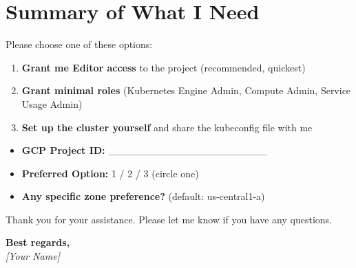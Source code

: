 \documentclass[11pt,a4paper]{article}
\begin{document}
\section{Summary of What I Need}

Please choose one of these options:

\begin{enumerate}[label=\textbf{\arabic*.}]
    \item \textbf{Grant me Editor access} to the project (recommended, quickest)
    \item \textbf{Grant minimal roles} (Kubernetes Engine Admin, Compute Admin, Service Usage Admin)
    \item \textbf{Set up the cluster yourself} and share the kubeconfig file with me
\end{enumerate}

\vspace{1em}

\begin{tcolorbox}[colback=blue!5,colframe=blue!50!black,title=\textbf{Information I Need From You}]
\begin{itemize}
    \item \textbf{GCP Project ID:} \_\_\_\_\_\_\_\_\_\_\_\_\_\_\_\_\_\_\_\_\_\_
    \item \textbf{Preferred Option:} 1 / 2 / 3 (circle one)
    \item \textbf{Any specific zone preference?} (default: us-central1-a)
\end{itemize}
\end{tcolorbox}

\vspace{2em}

Thank you for your assistance. Please let me know if you have any questions.

\vspace{2em}
\noindent\textbf{Best regards,}\\
\textit{[Your Name]}
\end{document}
